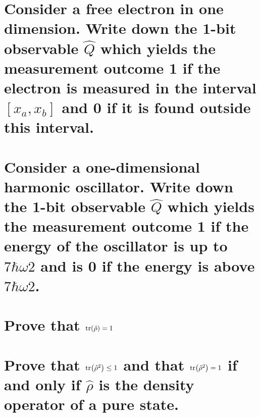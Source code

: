 \documentclass[boxes,pages]{homework}
\makeatletter
\numberwithin{@problem}{section}
\makeatother
\begin{document}
\begin{problem}
\begin{parts}
	\part{Consider a free electron in one dimension. Write down the 1-bit observable $\hat{Q}$ which yields the measurement outcome 1 if the electron is measured in the interval $[x_a, x_b]$ and 0 if it is found outside this interval.}\label{part:4a}
	\part{Consider a one-dimensional harmonic oscillator. Write down the 1-bit observable $\hat{Q}$ which yields the measurement outcome 1 if the energy of the oscillator is up to $7\hbar\omega 2$ and is 0 if the energy is above $7\hbar\omega 2$.}\label{part:4b}
\end{parts}
\end{problem}

\setcounter{section}{10}

\begin{problem}
\begin{parts}
	\part{Prove that $\tr(\hat{\rho}) = 1$}\label{part:1a}
	\part{Prove that $\tr(\hat{\rho}^2) \leq 1$ and that $\tr(\hat{\rho}^2) = 1$ if and only if $\hat{\rho}$ is the density operator of a pure state.}\label{part:1b}
\end{parts}
\end{problem}
\end{document}
